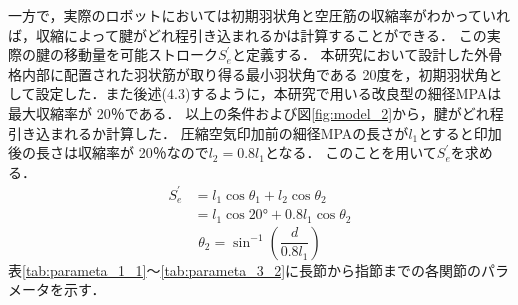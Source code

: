 一方で，実際のロボットにおいては初期羽状角と空圧筋の収縮率がわかっていれば，収縮によって腱がどれ程引き込まれるかは計算することができる．
この実際の腱の移動量を可能ストローク$S_{e}^{'}$と定義する．
本研究において設計した外骨格内部に配置された羽状筋が取り得る最小羽状角である 20度を，初期羽状角として設定した．また後述(4.3)するように，本研究で用いる改良型の細径MPAは最大収縮率が 20％である．
以上の条件および図\ref{fig:model_2}から，腱がどれ程引き込まれるか計算した．
圧縮空気印加前の細径MPAの長さが$l_1$とすると印加後の長さは収縮率が 20％なので$l_2 = 0.8l_1$となる．
このことを用いて$ S_{e}^{'}$を求める．
\begin{equation}
  \begin {split}
  S_{e}^{'}  & = l_1\cos\theta_1 + l_2\cos\theta_2\\
       & = l_1\cos20° + 0.8l_1\cos\theta_2
  \end{split}
\end{equation}
\begin{equation}
  \theta_2 = \sin^{-1}({\dfrac{d}{0.8 l_1}})
\end{equation}
表\ref{tab:parameta_1_1}～\ref{tab:parameta_3_2}に長節から指節までの各関節のパラメータを示す．
